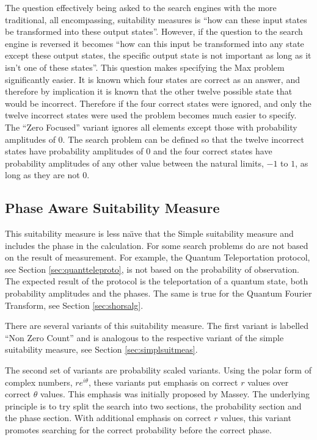The question effectively being asked to the search engines with the more traditional, all encompassing, suitability measures is ``how can these input states be transformed into these output states''.
However, if the question to the search engine is reversed it becomes ``how can this input be transformed into any state except these output states, the specific output state is not important as long as it isn't one of these states''.
This question makes specifying the Max problem significantly easier.
It is known which four states are correct as an answer, and therefore by implication it is known that the other twelve possible state that would be incorrect.
Therefore if the four correct states were ignored, and only the twelve incorrect states were used the problem becomes much easier to specify.
The ``Zero Focused'' variant ignores all elements except those with probability amplitudes of $0$.
The search problem can be defined so that the twelve incorrect states have probability amplitudes of $0$ and the four correct states have probability amplitudes of any other value between the natural limits, $-1$ to $1$, as long as they are not $0$.

\subsection{Phase Aware Suitability Measure}
\label{sec:phaseawaresuitmeas}
This suitability measure is less na\"{\i}ve that the Simple suitability measure and includes the phase in the calculation.
For some search problems do are not based on the result of measurement.
For example, the Quantum Teleportation protocol, see Section \ref{sec:quantteleproto}, is not based on the probability of observation.
The expected result of the protocol is the teleportation of a quantum state, both probability amplitudes and the phases.
The same is true for the Quantum Fourier Transform, see Section \ref{sec:shorsalg}.

There are several variants of this suitability measure.
The first variant is labelled ``Non Zero Count'' and is analogous to the respective variant of the simple suitability measure, see Section \ref{sec:simplsuitmeas}.

The second set of variants are probability scaled variants.
Using the polar form of complex numbers, $re^{i\theta}$, these variants put emphasis on correct $r$ values over correct $\theta$ values.
This emphasis was initially proposed by Massey\cite{masseythesis}.
The underlying principle is to try split the search into two sections, the probability section and the phase section.
With additional emphasis on correct $r$ values, this variant promotes searching for the correct probability before the correct phase.

